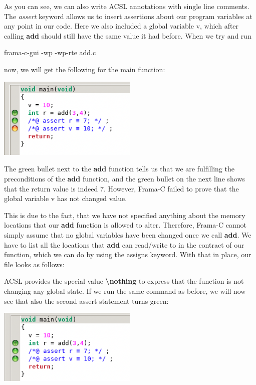 
As you can see, we can also write ACSL annotations with single line comments. The \emph{assert} keyword allows us to insert assertions about our program variables at any point in our code. Here we also included a global variable v, which after calling \textbf{add} should still have the same value it had before. When we try and run

\begin{ubuntu}
frama-c-gui -wp -wp-rte add.c
\end{ubuntu}

now, we will get the following for the main function:

\begin{center}
    \includegraphics[width=0.5\textwidth]{images/frama_c_add_main.png}
\end{center}

The green bullet next to the \textbf{add} function tells us that we are fulfilling the preconditions of the \textbf{add} function, and the green bullet on the next line shows that the return value is indeed 7. However, Frama-C failed to prove that the global variable v has not changed value. 

This is due to the fact, that we have not specified anything about the memory locations that our \textbf{add} function is allowed to alter. Therefore, Frama-C cannot simply assume that no global variables have been changed once we call \textbf{add}. We have to list all the locations that \textbf{add} can read/write to in the contract of our function, which we can do by using the assigns keyword. With that in place, our file looks as follows:


ACSL provides the special value \textbf{\textbackslash nothing} to express that the function is not changing any global state. If we run the same command as before, we will now see that also the second assert statement turns green: 

\begin{center}
    \includegraphics[width=0.5\textwidth]{images/frama_c_add_all_green.png}
\end{center}

